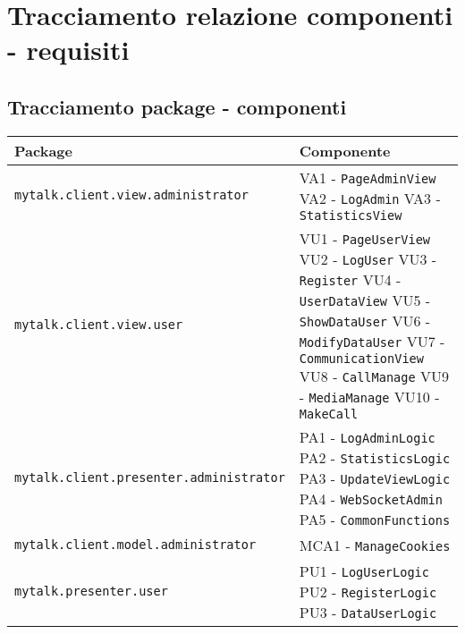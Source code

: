 \section{Tracciamento relazione componenti - requisiti}{

\subsection{Tracciamento package - componenti}{

	\begin{longtable}{p{} p{}}
\toprule
\textbf{Package}	&	\textbf{Componente}\\
\midrule
\midrule
\texttt{mytalk.client.view.administrator}	&
{VA1 - \texttt{PageAdminView}}\newline
{VA2 - \texttt{LogAdmin}}\newline
{VA3 - \texttt{StatisticsView}}\\
\midrule
\texttt{mytalk.client.view.user}	&
{VU1 - \texttt{PageUserView}}\newline
{VU2 - \texttt{LogUser}}\newline
{VU3 - \texttt{Register}}\newline
{VU4 - \texttt{UserDataView}}\newline
{VU5 - \texttt{ShowDataUser}}\newline
{VU6 - \texttt{ModifyDataUser}}\newline
{VU7 - \texttt{CommunicationView}}\newline
{VU8 - \texttt{CallManage}}\newline
{VU9 - \texttt{MediaManage}}\newline
{VU10 - \texttt{MakeCall}}\\
\midrule
\texttt{mytalk.client.presenter.administrator}	&
{PA1 - \texttt{LogAdminLogic}}\newline
{PA2 - \texttt{StatisticsLogic}}\newline
{PA3 - \texttt{UpdateViewLogic}}\newline
{PA4 - \texttt{WebSocketAdmin}}\newline
{PA5 - \texttt{CommonFunctions}}\\
\midrule
\texttt{mytalk.client.model.administrator}	&
{MCA1 - \texttt{ManageCookies}}\\
\midrule
\texttt{mytalk.presenter.user}	&
{PU1 - \texttt{LogUserLogic}}\newline
{PU2 - \texttt{RegisterLogic}}\newline
{PU3 - \texttt{DataUserLogic}}\newline

\end{longtable}}}
